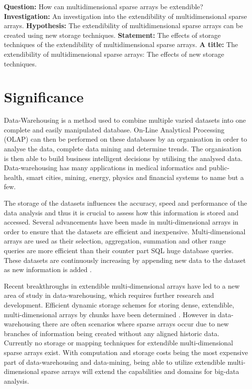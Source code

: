 \textbf{Question:}
\newline
How can multidimensional sparse arrays be extendible?
\newline
\textbf{Investigation:}
\newline
An investigation into the extendibility of multidimensional sparse arrays.
\newline
\textbf{Hypothesis:}
\newline
The extendibility of multidimensional sparse arrays can be created using new storage techniques.
\newline
\textbf{Statement:}
\newline
The effects of storage techniques of the extendibility of multidimensional sparse arrays.
\newline
\textbf{A title:}
\newline
The extendibility of multidimensional sparse arrays: The effects of new storage techniques.

\section{Significance}
Data-Warehousing is a method used to combine multiple varied datasets into one complete and easily manipulated database. On-Line Analytical Processing (OLAP) can then be performed on these databases by an organisation in order to analyse the data, complete data mining and determine trends. The organisation is then able to build business intelligent decisions by utilising the analysed data. Data-warehousing has many applications in medical informatics and public-health, smart cities, mining, energy, physics and financial systems to name but a few.

The storage of the datasets influences the accuracy, speed and performance of the data analysis and thus it is crucial to assess how this information is stored and accessed. Several advancements have been made in multi-dimensional arrays in order to ensure that the datasets are efficient and inexpensive. Multi-dimensional arrays are used as their selection, aggregation, summation and other range queries are more efficient than their counter part SQL huge database queries. These datasets are continuously increasing by appending new data to the dataset as new information is added \cite{otoo:2006:esa}.

Recent breakthroughs in extendible multi-dimensional arrays have led to a new area of study in data-warehousing, which requires further research and development. Efficient dynamic storage schemes for storing dense, extendible, multi-dimensional arrays by chunks have been determined \cite{nimako:2012:ced}. However in data-warehousing there are often scenarios where sparse arrays occur due to new branches of information being created without any aligned historic data. Currently no storage or mapping techniques for extendible multi-dimensional sparse arrays exist. With computation and storage costs being the most expensive part of data-warehousing and data-mining, being able to utilize extendible multi-dimensional sparse arrays will extend the capabilities and domains for big-data analysis.
